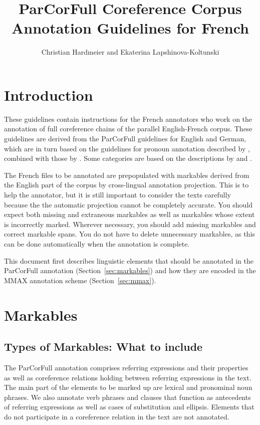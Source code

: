 \documentclass[a4paper]{article}
\title{ParCorFull Coreference Corpus Annotation Guidelines for French}
\author{Christian Hardmeier and Ekaterina Lapshinova-Koltunski}
\begin{document}
\maketitle
\tableofcontents

\section{Introduction}

These guidelines contain instructions for the French annotators who work on the
annotation of full coreference chains of the parallel English-French corpus.
These guidelines are derived from the ParCorFull guidelines for English and
German, which are in turn based on the guidelines for pronoun annotation
described by \cite{GuillouEtAlGuide}, combined with those by
\cite{GrishinaStedeGuide}. Some categories are based on the descriptions by
\cite{Kunz2012} and \cite{NedoluzhkoMirovsky201}.

The French files to be annotated are prepopulated with markables derived from
the English part of the corpus by cross-lingual annotation projection. This is
to help the annotator, but it is still important to consider the texts carefully
because the the automatic projection cannot be completely accurate. You should
expect both missing and extraneous markables as well as markables whose extent
is incorrectly marked. Wherever necessary, you should add missing markables and
correct markable spans. You do not have to delete unnecessary markables, as this
can be done automatically when the annotation is complete.

This document first describes linguistic elements that should be annotated in
the ParCorFull annotation (Section~\ref{sec:markables}) and how they are encoded
in the MMAX annotation scheme (Section~\ref{sec:mmax}).

\section{\label{sec:markables}Markables}

\subsection{Types of Markables: What to include}

The ParCorFull annotation comprises referring expressions and their properties
as well as coreference relations holding between referring expressions in the
text. The main part of the elements to be marked up are lexical and pronominal
noun phrases. We also annotate verb phrases and clauses that function as
antecedents of referring expressions as well as cases of substitution and
ellipsis. Elements that do not participate in a coreference relation in the text
are not annotated.
\end{document}
